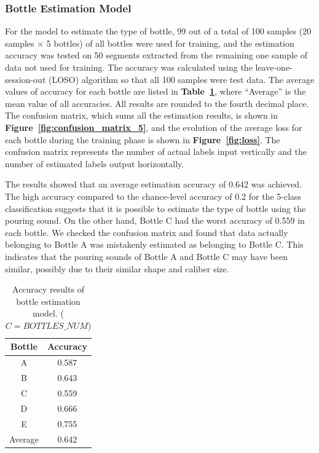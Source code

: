 \documentclass[manuscript,screen,review]{acmart}
\newcommand\figref[1]{\textbf{Figure~\ref{fig:#1}}}
\newcommand\tabref[1]{\textbf{Table~\ref{tab:#1}}}
\begin{document}
\subsubsection{Bottle Estimation Model}
For the model to estimate the type of bottle, 99 out of a total of 100 samples (20 samples $\times$ 5 bottles) of all bottles were used for training, and the estimation accuracy was tested on 50 segments extracted from the remaining one sample of data not used for training. The accuracy was calculated using the leave-one-session-out (LOSO) algorithm so that all 100 samples were test data. The average values of accuracy for each bottle are listed in \tabref{result_5}, where ``Average'' is the mean value of all accuracies. All results are rounded to the fourth decimal place. The confusion matrix, which sums all the estimation results, is shown in \figref{confusion_matrix_5}, and the evolution of the average loss for each bottle during the training phase is shown in \figref{loss}. The confusion matrix represents the number of actual labels input vertically and the number of estimated labels output horizontally.\par

The results showed that an average estimation accuracy of 0.642 was achieved. The high accuracy compared to the chance-level accuracy of 0.2 for the 5-class classification suggests that it is possible to estimate the type of bottle using the pouring sound. On the other hand, Bottle C had the worst accuracy of 0.559 in each bottle. We checked the confusion matrix and found that data actually belonging to Bottle A was mistakenly estimated as belonging to Bottle C. This indicates that the pouring sounds of Bottle A and Bottle C may have been similar, possibly due to their similar shape and caliber size.

\begin{table}[!t]
  \small
  \centering
  \caption{Accuracy results of bottle estimation model. ($C=BOTTLES\_NUM$)}
  \begin{tabular}{c|c} \hline\hline
    Bottle & Accuracy \\ \hline
    A & 0.587 \\
    B & 0.643 \\
    C & 0.559 \\
    D & 0.666 \\
    E & 0.755 \\ \hline
    Average & 0.642 \\ \hline
  \end{tabular}
  \label{tab:result_5}
\end{table}
\end{document}
